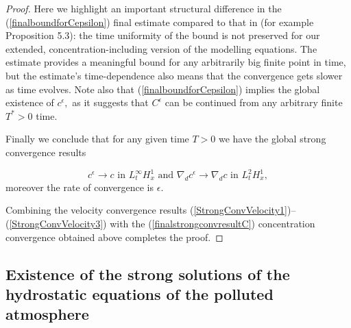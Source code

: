 \documentclass[12pt]{report}
\numberwithin{theorem}{chapter}
\numberwithin{corollary}{chapter}
\numberwithin{lemma}{chapter}
\numberwithin{remark}{chapter}
\numberwithin{definition}{chapter}
\numberwithin{prop}{chapter}
\begin{document}
\begin{proof}
Here we highlight an important structural difference in the (\ref{finalboundforCepsilon}) final estimate compared to that in \cite{li2019primitive} (for example Proposition 5.3): the time uniformity of the bound is not preserved for our extended, concentration-including version of the modelling equations. The estimate provides a meaningful bound for any arbitrarily big finite point in time, but the estimate's time-dependence also means that the convergence gets slower as time evolves. Note also that (\ref{finalboundforCepsilon}) implies the global existence of $c^\epsilon,$ as it suggests that $C^\epsilon$ can be continued from any arbitrary finite $T^* > 0$ time.

Finally we conclude that for any given time $T > 0$ we have the global strong convergence results

\begin{equation} \label{finalstrongconvresultC}
c^\epsilon \to c \text{ in } L_t^\infty H_x^1 \text{ and } \nabla_d c^\epsilon \to \nabla_d c \text{ in } L_t^2 H_x^1,
\end{equation}
%
moreover the rate of convergence is $\epsilon.$

Combining the velocity convergence results (\ref{StrongConvVelocity1})--(\ref{StrongConvVelocity3}) with the (\ref{finalstrongconvresultC}) concentration convergence obtained above completes the proof.

\end{proof}

\subsection{Existence of the strong solutions of the hydrostatic equations of the polluted atmosphere} \label{strongexistencesection}
\end{document}
